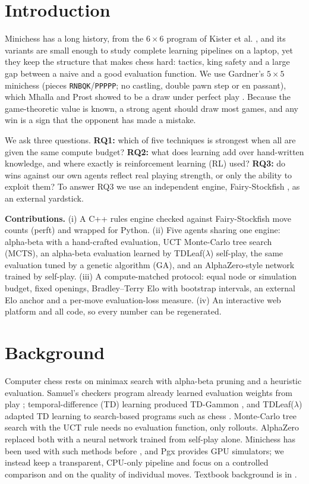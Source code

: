 \section{Introduction}
Minichess has a long history, from the $6\times6$ program of Kister et al. \cite{kister1957}, and its variants are small enough to study complete learning pipelines on a laptop, yet they keep the structure that makes chess hard: tactics, king safety and a large gap between a naive and a good evaluation function. We use Gardner's $5\times5$ minichess (pieces \texttt{RNBQK}/\texttt{PPPPP}; no castling, double pawn step or en passant), which Mhalla and Prost showed to be a draw under perfect play \cite{mhalla2013}. Because the game-theoretic value is known, a strong agent should draw most games, and any win is a sign that the opponent has made a mistake.

We ask three questions. \textbf{RQ1:} which of five techniques is strongest when all are given the same compute budget? \textbf{RQ2:} what does learning add over hand-written knowledge, and where exactly is reinforcement learning (RL) used? \textbf{RQ3:} do wins against our own agents reflect real playing strength, or only the ability to exploit them? To answer RQ3 we use an independent engine, Fairy-Stockfish \cite{fairy}, as an external yardstick.

\textbf{Contributions.} (i) A C++ rules engine checked against Fairy-Stockfish move counts (perft) and wrapped for Python. (ii) Five agents sharing one engine: alpha-beta with a hand-crafted evaluation, UCT Monte-Carlo tree search (MCTS), an alpha-beta evaluation learned by TDLeaf($\lambda$) self-play, the same evaluation tuned by a genetic algorithm (GA), and an AlphaZero-style network trained by self-play. (iii) A compute-matched protocol: equal node or simulation budget, fixed openings, Bradley--Terry Elo with bootstrap intervals, an external Elo anchor and a per-move evaluation-loss measure. (iv) An interactive web platform and all code, so every number can be regenerated.

\section{Background}
Computer chess rests on minimax search with alpha-beta pruning \cite{shannon1950,knuth1975} and a heuristic evaluation. Samuel's checkers program already learned evaluation weights from play \cite{samuel1959}; temporal-difference (TD) learning produced TD-Gammon \cite{tesauro1995}, and TDLeaf($\lambda$) adapted TD learning to search-based programs such as chess \cite{baxter2000}. Monte-Carlo tree search with the UCT rule \cite{kocsis2006,coulom2007,browne2012} needs no evaluation function, only rollouts. AlphaZero \cite{silver2018,silver2017} replaced both with a neural network trained from self-play alone. Minichess has been used with such methods before \cite{sun2021,hammersborg2022}, and Pgx \cite{koyamada2023} provides GPU simulators; we instead keep a transparent, CPU-only pipeline and focus on a controlled comparison and on the quality of individual moves. Textbook background is in \cite{sutton2018,russell2021}.

